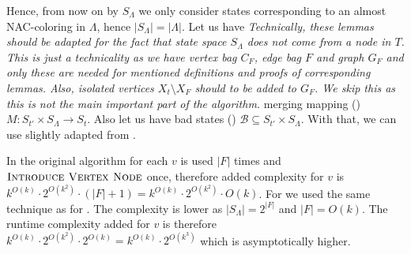 Hence, from now on by \( S_\Lambda \) we only consider states corresponding to
an almost NAC-coloring in \( \Lambda \), hence \( |S_\Lambda| = |\Lambda| \).
%
Let us have
\emph{
	Technically, these lemmas should be adapted for the fact that state space \( S_\Lambda \)
	does not come from a node in \( T \). This is just a technicality
	as we have vertex bag \( C_F \), edge bag \( F \) and graph \( G_F \)
	and only these are needed for mentioned definitions and proofs of corresponding lemmas.
	Also, isolated vertices \( X_t \setminus X_F \) should to be added to \( G_F \).
	We skip this as this is not the main important part of the algorithm.
}
merging mapping ()
\( M : S_{t'} \times S_\Lambda \to S_t \).
Also let us have bad states ()
\( \mathcal{B} \subseteq S_{t'} \times S_\Lambda \).
%
With that, we can use slightly adapted 
from \JoinNode{}.


In the original algorithm for each \( v \)
\IntroduceEdgeNode{} is used \( |F| \) times
and \( \textsc{Introduce Vertex Node}{} \) once, therefore added complexity for \( v \)
is \( {k}^{O(k)} \cdot 2^{O(k^2)} \cdot (|F| + 1) = {k}^{O(k)} \cdot 2^{O(k^2)} \cdot O(k) \).
%
For \IntroduceVertexWithEdgesNode{}
we used the same technique as for \JoinNode{}.
The complexity is lower as \( |S_\Lambda| = 2^{|F|} \) and \( |F| = O(k) \).
The runtime complexity added for \( v \) is therefore
\( {k}^{O(k)} \cdot 2^{O(k^2)} \cdot 2^{O(k)} = {k}^{O(k)} \cdot 2^{O(k^3)}\)
which is asymptotically higher.



